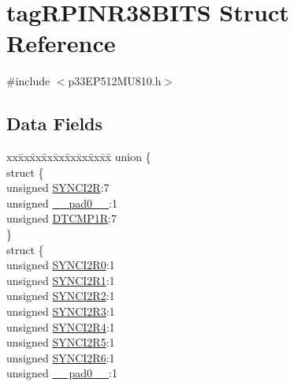 \hypertarget{structtag_r_p_i_n_r38_b_i_t_s}{}\section{tag\+R\+P\+I\+N\+R38\+B\+I\+TS Struct Reference}
\label{structtag_r_p_i_n_r38_b_i_t_s}


{\ttfamily \#include $<$p33\+E\+P512\+M\+U810.\+h$>$}

\subsection*{Data Fields}
\begin{DoxyCompactItemize}
\item 
\begin{tabbing}
xx\=xx\=xx\=xx\=xx\=xx\=xx\=xx\=xx\=\kill
union \{\\
\>struct \{\\
\>\>unsigned \hyperlink{structtag_r_p_i_n_r38_b_i_t_s_a8fb472754ce0861fe4fed0cd2e4b9d7c}{SYNCI2R}:7\\
\>\>unsigned \hyperlink{structtag_r_p_i_n_r38_b_i_t_s_adf71f3d8410c1f1dbbc96680a92c49af}{\_\_pad0\_\_}:1\\
\>\>unsigned \hyperlink{structtag_r_p_i_n_r38_b_i_t_s_a0939fac1dc78bada8ca6d27c434eb7ee}{DTCMP1R}:7\\
\>\} \\
\>struct \{\\
\>\>unsigned \hyperlink{structtag_r_p_i_n_r38_b_i_t_s_a9fe29d05a4e9b24be07ad19bedf98a43}{SYNCI2R0}:1\\
\>\>unsigned \hyperlink{structtag_r_p_i_n_r38_b_i_t_s_a192b33763d7751a29ba9cc613d82bca7}{SYNCI2R1}:1\\
\>\>unsigned \hyperlink{structtag_r_p_i_n_r38_b_i_t_s_a49dd1b2328597c075169804d191efa2d}{SYNCI2R2}:1\\
\>\>unsigned \hyperlink{structtag_r_p_i_n_r38_b_i_t_s_aaae69bd169f6ab107b511c4c335f13aa}{SYNCI2R3}:1\\
\>\>unsigned \hyperlink{structtag_r_p_i_n_r38_b_i_t_s_a97fd1896e959eb1e14eb52ff013cffce}{SYNCI2R4}:1\\
\>\>unsigned \hyperlink{structtag_r_p_i_n_r38_b_i_t_s_a2351c0ea688194725b7106d0555412c4}{SYNCI2R5}:1\\
\>\>unsigned \hyperlink{structtag_r_p_i_n_r38_b_i_t_s_ada0ea089b5dc81ce5834952446f6a5dd}{SYNCI2R6}:1\\
\>\>unsigned \hyperlink{structtag_r_p_i_n_r38_b_i_t_s_adf71f3d8410c1f1dbbc96680a92c49af}{\_\_pad0\_\_}:1\\

\end{tabbing}
\end{DoxyCompactItemize}
